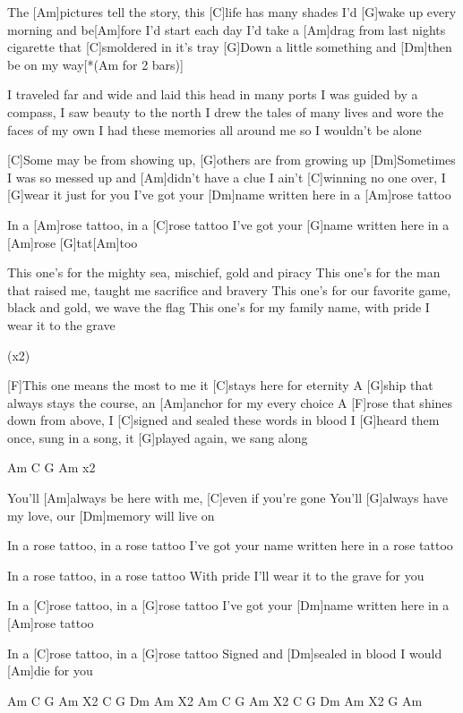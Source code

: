 \begin{guitar}
	The [Am]pictures tell the story, this [C]life has many shades
	I’d [G]wake up every morning and be[Am]fore I’d start each day
	I’d take a [Am]drag from last nights cigarette that [C]smoldered in it’s tray
	[G]Down a little something and [Dm]then be on my way[*(Am for 2 bars)]{}
	
	I traveled far and wide and laid this head in many ports
	I was guided by a compass, I saw beauty to the north
	I drew the tales of many lives and wore the faces of my own 
	I had these memories all around me so I wouldn’t be alone
	
	[C]Some may be from showing up, [G]others are from growing up
	[Dm]Sometimes I was so messed up and [Am]didn’t have a clue
	I ain’t [C]winning no one over, I [G]wear it just for you
	I’ve got your [Dm]name written here in a [Am]rose tattoo
	
	In a [Am]rose tattoo, in a [C]rose tattoo
	I’ve got your [G]name written here in a [Am]rose [G]tat[Am]too
	
	This one's for the mighty sea, mischief, gold and piracy
	This one's for the man that raised me, taught me sacrifice and bravery
	This one's for our favorite game, black and gold, we wave the flag
	This one's for my family name, with pride I wear it to the grave
	
	 
	
	  (x2)
	
	\pagebreak
	
	[F]This one means the most to me it [C]stays here for eternity
	A [G]ship that always stays the course, an [Am]anchor for my every choice
	A [F]rose that shines down from above, I [C]signed and sealed these words in blood
	I [G]heard them once, sung in a song, it [G]played again, we sang along
	
	Am  C  G  Am  x2
	
	You’ll [Am]always be here with me, [C]even if you’re gone
	You’ll [G]always have my love, our [Dm]memory will live on
	
	 
	
	In a rose tattoo, in a rose tattoo
	I’ve got your name written here in a rose tattoo
	
	In a rose tattoo, in a rose tattoo
	With pride I'll wear it to the grave for you
	
	In a [C]rose tattoo, in a [G]rose tattoo
	I’ve got your [Dm]name written here in a [Am]rose tattoo
	
	In a [C]rose tattoo, in a [G]rose tattoo
	Signed and [Dm]sealed in blood I would [Am]die for you
	
	Am C G Am X2   C G Dm Am X2   Am C G Am X2   C G Dm Am X2   G Am
	
\end{guitar}